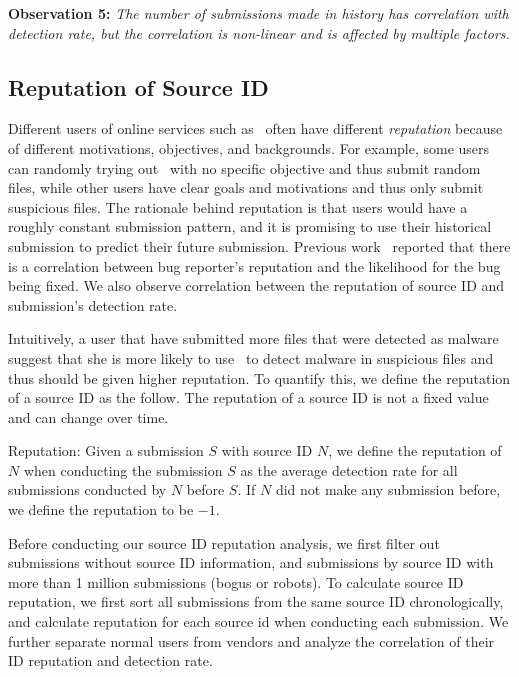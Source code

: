 {\bf Observation 5:} 
{\em The number of submissions made in history has correlation with detection rate, but the correlation is non-linear and is affected by multiple factors.}


\subsection{Reputation of Source ID}
\label{sec:reputation}


Different users of online services such as \vt\ often have different {\em reputation} 
because of different motivations, objectives, and backgrounds.
For example, some users can randomly trying out \vt\ with no specific objective and thus submit random files,
while other users have clear goals and motivations and thus only submit suspicious files.
The rationale behind reputation is that \vt{} users would have a roughly constant submission pattern, 
and it is promising to use their historical submission to predict their future submission.
Previous work~\cite{GuoICSE2010} reported that there is a correlation between bug reporter's reputation and the likelihood for the bug being fixed. 
We also observe correlation between the reputation of source ID and submission's detection rate. 

Intuitively, a user that have submitted more files that were detected as malware suggest 
that she is more likely to use \vt\ to detect malware in suspicious files 
and thus should be given higher reputation.
To quantify this, we define the reputation of a source ID as the follow.
The reputation of a source ID is not a fixed value and can change over time. 

\begin{definition}{Reputation:}
Given a submission $S$ with source ID $N$, 
we define the reputation of $N$ when conducting the submission $S$ as the average detection rate for all submissions conducted by $N$ before $S$. 
If $N$ did not make any submission before, we define the reputation to be $-1$. 
\end{definition}

Before conducting our source ID reputation analysis, we first filter out submissions
without source ID information, and submissions by source ID with more than 1 million submissions (bogus or robots).
To calculate source ID reputation, we first sort all submissions from the same source ID chronologically, 
and calculate reputation for each source id when conducting each submission. 
We further separate normal users from vendors and analyze the correlation of their ID reputation and detection rate.

